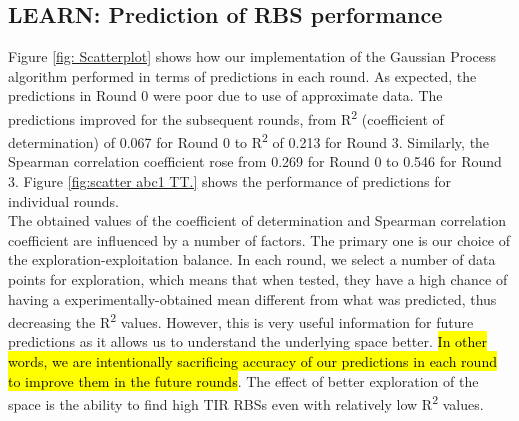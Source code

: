 \documentclass{article}
\begin{document}
\subsection{LEARN: Prediction of RBS performance}
\label{sec:gp-results}


Figure \ref{fig: Scatterplot} shows how our implementation of the Gaussian Process algorithm performed in terms of predictions in each round. 
As expected, the predictions in Round 0 were poor due to use of approximate data. 
The predictions improved for the subsequent rounds, from R\textsuperscript{2} (coefficient of determination) of 0.067 for Round 0 to R\textsuperscript{2} of 0.213 for Round 3.
Similarly, the Spearman correlation coefficient rose from 0.269 for Round 0 to 0.546 for Round 3.
Figure \ref{fig:scatter abc1 TT.} shows the performance of predictions for individual rounds.\\

The obtained values of the coefficient of determination and Spearman correlation coefficient are influenced by a number of factors.
The primary one is our choice of the exploration-exploitation balance.
In each round, we select a number of data points for exploration, which means that when tested, they have a high chance of having a experimentally-obtained mean different from what was predicted, thus decreasing the R\textsuperscript{2} values.
However, this is very useful information for future predictions as it allows us to understand the underlying space better.
\hl{In other words, we are intentionally sacrificing accuracy of our predictions in each round to improve them in the future rounds}. 
The effect of better exploration of the space is the ability to find high TIR RBSs even with relatively low R\textsuperscript{2} values.\\
\end{document}
